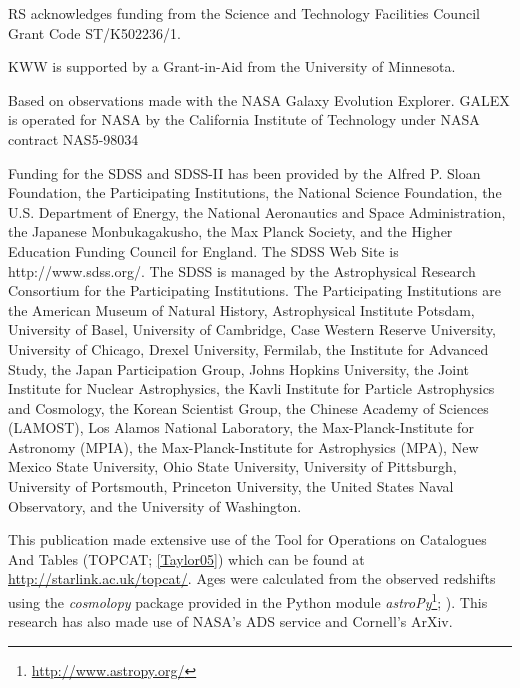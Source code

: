 \documentclass[useAMS,usenatbib]{mn2e}
\begin{document}
RS acknowledges funding from the Science and Technology Facilities Council Grant Code ST/K502236/1.

KWW is supported by a Grant-in-Aid from the University of Minnesota.

Based on observations made with the NASA Galaxy Evolution Explorer.  GALEX is operated for NASA by the California Institute of Technology under NASA contract NAS5-98034

Funding for the SDSS and SDSS-II has been provided by the Alfred P. Sloan Foundation, the Participating Institutions, the National Science Foundation, the U.S. Department of Energy, the National Aeronautics and Space Administration, the Japanese Monbukagakusho, the Max Planck Society, and the Higher Education Funding Council for England. The SDSS Web Site is http://www.sdss.org/.
The SDSS is managed by the Astrophysical Research Consortium for the Participating Institutions. The Participating Institutions are the American Museum of Natural History, Astrophysical Institute Potsdam, University of Basel, University of Cambridge, Case Western Reserve University, University of Chicago, Drexel University, Fermilab, the Institute for Advanced Study, the Japan Participation Group, Johns Hopkins University, the Joint Institute for Nuclear Astrophysics, the Kavli Institute for Particle Astrophysics and Cosmology, the Korean Scientist Group, the Chinese Academy of Sciences (LAMOST), Los Alamos National Laboratory, the Max-Planck-Institute for Astronomy (MPIA), the Max-Planck-Institute for Astrophysics (MPA), New Mexico State University, Ohio State University, University of Pittsburgh, University of Portsmouth, Princeton University, the United States Naval Observatory, and the University of Washington.

This publication made extensive use of the Tool for Operations on Catalogues And Tables (TOPCAT; \ref{Taylor05}) which can be found at \url{http://starlink.ac.uk/topcat/}. Ages were calculated from the observed redshifts using the \emph{cosmolopy} package provided in the Python module \emph{astroPy}\footnote{\url{http://www.astropy.org/}}; \citealt{Rob13}). This research has also made use of NASA's ADS service and Cornell's ArXiv. 
\end{document}
